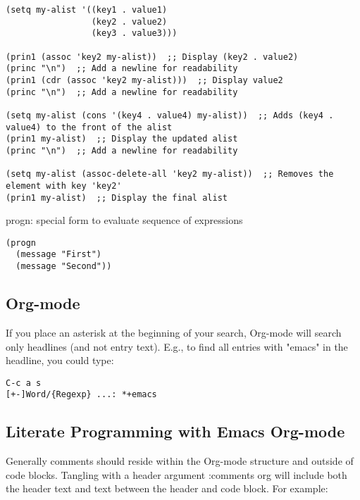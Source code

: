 \documentclass{article}
\begin{document}
\begin{verbatim}
(setq my-alist '((key1 . value1)
                 (key2 . value2)
                 (key3 . value3)))

(prin1 (assoc 'key2 my-alist))  ;; Display (key2 . value2)
(princ "\n")  ;; Add a newline for readability
(prin1 (cdr (assoc 'key2 my-alist)))  ;; Display value2
(princ "\n")  ;; Add a newline for readability

(setq my-alist (cons '(key4 . value4) my-alist))  ;; Adds (key4 . value4) to the front of the alist
(prin1 my-alist)  ;; Display the updated alist
(princ "\n")  ;; Add a newline for readability

(setq my-alist (assoc-delete-all 'key2 my-alist))  ;; Removes the element with key 'key2'
(prin1 my-alist)  ;; Display the final alist
\end{verbatim}




progn: special form to evaluate sequence of expressions\\[0pt]
\begin{verbatim}
(progn
  (message "First")
  (message "Second"))

\end{verbatim}
\subsection{Org-mode}
\label{sec:org9c694ad}

If you place an asterisk at the beginning of your search, Org-mode will search only headlines (and not entry text). E.g., to find all entries with "emacs" in the headline, you could type:\\[0pt]

\begin{verbatim}
C-c a s
[+-]Word/{Regexp} ...: *+emacs

\end{verbatim}
\subsection{Literate Programming with Emacs Org-mode}
\label{sec:org292b6e8}

Generally comments should reside within the Org-mode structure and outside of code blocks. Tangling with a header argument :comments org will include both the header text and text between the header and code block. For example:\\[0pt]
\end{document}
